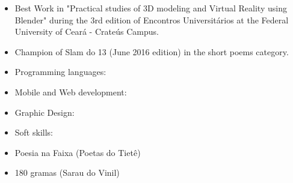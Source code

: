 \vspace{0.5 mm}
\begin{itemize}
\item Best Work in "Practical studies of 3D modeling and Virtual Reality using Blender" during the 3rd edition of Encontros Universitários at the Federal University of Ceará - Crateús Campus.
\smallskip
\item Champion of Slam do 13 (June 2016 edition) in the short poems category.
\end{itemize}

\vspace{1.5 mm}

\begin{itemize}
\item Programming languages:
\end{itemize}

\vspace{2.5 mm}

\begin{itemize}
\item Mobile and Web development:
\end{itemize}

\vspace{2.5 mm}

\begin{itemize}
\item Graphic Design:
\end{itemize}

\vspace{2.5 mm}

\begin{itemize}
\item Soft skills:
\end{itemize}

\vspace{3 mm}

\smallskip
{}
\smallskip
{}
\begin{itemize}
\item Poesia na Faixa (Poetas do Tietê)
\item 180 gramas (Sarau do Vinil)
\end{itemize}

